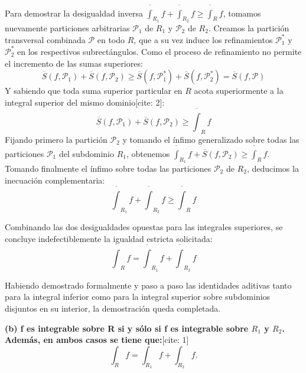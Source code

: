 \documentclass[11pt,letterpaper]{article}
\begin{document}
Para demostrar la desigualdad inversa $\overline{\int}_{R_{1}}f + \overline{\int}_{R_{2}}f \ge \overline{\int}_{R}f$, tomamos nuevamente particiones arbitrarias $\mathcal{P}_{1}$ de $R_{1}$ y $\mathcal{P}_{2}$ de $R_{2}$. Creamos la partición transversal combinada $\mathcal{P}$ en todo $R$, que a su vez induce los refinamientos $\mathcal{P}_{1}^{*}$ y $\mathcal{P}_{2}^{*}$ en los respectivos subrectángulos.
Como el proceso de refinamiento no permite el incremento de las sumas superiores:
\begin{equation*}
\overline{S}(f, \mathcal{P}_{1}) + \overline{S}(f, \mathcal{P}_{2}) \ge \overline{S}(f, \mathcal{P}_{1}^{*}) + \overline{S}(f, \mathcal{P}_{2}^{*}) = \overline{S}(f, \mathcal{P})
\end{equation*}
Y sabiendo que toda suma superior particular en $R$ acota superiormente a la integral superior del mismo dominio[cite: 2]:
\begin{equation*}
\overline{S}(f, \mathcal{P}_{1}) + \overline{S}(f, \mathcal{P}_{2}) \ge \overline{\int}_{R}f
\end{equation*}
Fijando primero la partición $\mathcal{P}_{2}$ y tomando el ínfimo generalizado sobre todas las particiones $\mathcal{P}_{1}$ del subdominio $R_{1}$, obtenemos $\overline{\int}_{R_{1}}f + \overline{S}(f, \mathcal{P}_{2}) \ge \overline{\int}_{R}f$. Tomando finalmente el ínfimo sobre todas las particiones $\mathcal{P}_{2}$ de $R_{2}$, deducimos la inecuación complementaria:
\begin{equation*}
\overline{\int}_{R_{1}}f + \overline{\int}_{R_{2}}f \ge \overline{\int}_{R}f
\end{equation*}

Combinando las dos desigualdades opuestas para las integrales superiores, se concluye indefectiblemente la igualdad estricta solicitada:
\begin{equation*}
\overline{\int}_{R}f = \overline{\int}_{R_{1}}f + \overline{\int}_{R_{2}}f
\end{equation*}

Habiendo demostrado formalmente y paso a paso las identidades aditivas tanto para la integral inferior como para la integral superior sobre subdominios disjuntos en su interior, la demostración queda completada.

\textbf{(b) f es integrable sobre R si y sólo si f es integrable sobre $R_{1}$ y $R_{2}$. Además, en ambos casos se tiene que:}[cite: 1]
\begin{equation*}
\int_{R}f=\int_{R_{1}}f+\int_{R_{2}}f.
\end{equation*}
\end{document}
